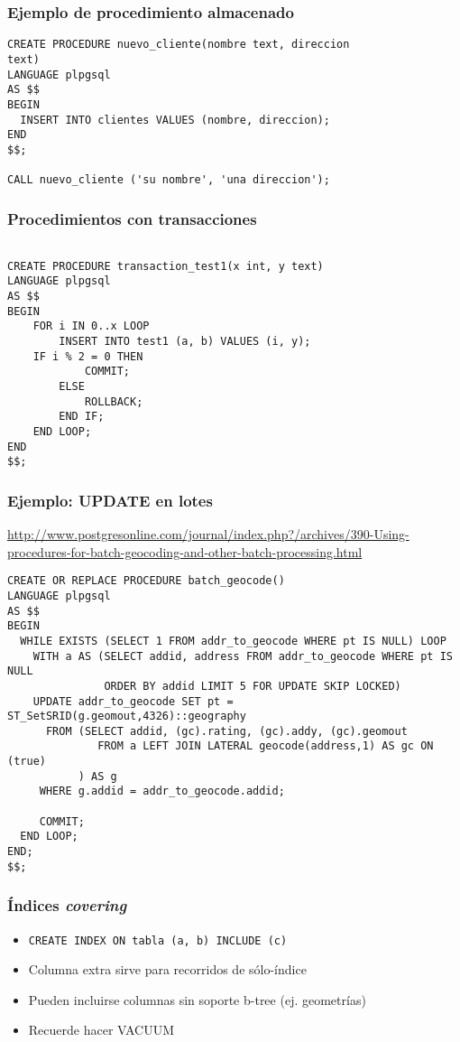 \begin{frame}[fragile]
  \frametitle{Ejemplo de procedimiento almacenado}

\begin{lstlisting}
CREATE PROCEDURE nuevo_cliente(nombre text, direccion
text)
LANGUAGE plpgsql
AS $$
BEGIN
  INSERT INTO clientes VALUES (nombre, direccion);
END
$$;

CALL nuevo_cliente ('su nombre', 'una direccion');

\end{lstlisting}

\end{frame}

\begin{frame}[fragile]
  \frametitle{Procedimientos con transacciones}

\footnotesize
\begin{lstlisting}

CREATE PROCEDURE transaction_test1(x int, y text)
LANGUAGE plpgsql
AS $$
BEGIN
    FOR i IN 0..x LOOP
        INSERT INTO test1 (a, b) VALUES (i, y);
	IF i % 2 = 0 THEN
            COMMIT;
        ELSE
            ROLLBACK;
        END IF;
    END LOOP;
END
$$;
\end{lstlisting}
\end{frame}

\begin{frame}[fragile]
  \frametitle{Ejemplo: UPDATE en lotes}

\footnotesize
\url{http://www.postgresonline.com/journal/index.php?/archives/390-Using-procedures-for-batch-geocoding-and-other-batch-processing.html}
\begin{lstlisting}
CREATE OR REPLACE PROCEDURE batch_geocode()
LANGUAGE plpgsql
AS $$
BEGIN
  WHILE EXISTS (SELECT 1 FROM addr_to_geocode WHERE pt IS NULL) LOOP
    WITH a AS (SELECT addid, address FROM addr_to_geocode WHERE pt IS NULL
               ORDER BY addid LIMIT 5 FOR UPDATE SKIP LOCKED)
    UPDATE addr_to_geocode SET pt = ST_SetSRID(g.geomout,4326)::geography
      FROM (SELECT addid, (gc).rating, (gc).addy, (gc).geomout
              FROM a LEFT JOIN LATERAL geocode(address,1) AS gc ON (true)
           ) AS g
     WHERE g.addid = addr_to_geocode.addid;

     COMMIT;
  END LOOP;
END;
$$;
\end{lstlisting}

\end{frame}

\begin{frame}
  \frametitle{Índices \emph{covering}}

\begin{itemize}
  \item \texttt{CREATE INDEX ON tabla (a, b) INCLUDE (c)}
  \item Columna extra sirve para recorridos de sólo-índice
  \item Pueden incluirse columnas sin soporte b-tree (ej. geometrías)
  \item Recuerde hacer VACUUM
\end{itemize}

\end{frame}

